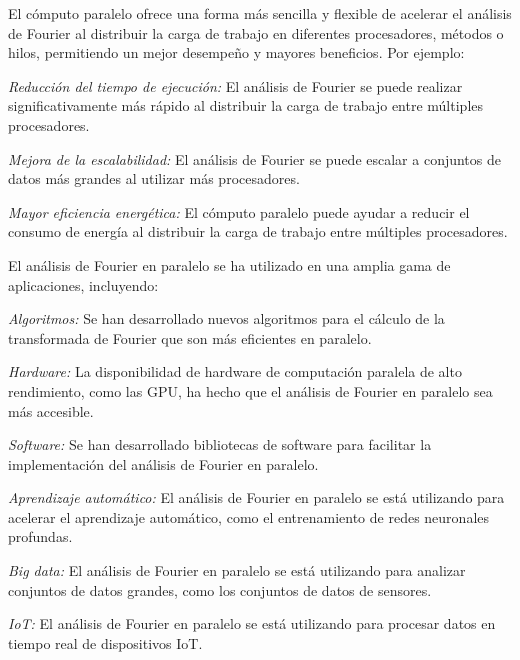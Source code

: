 El cómputo paralelo ofrece una forma más sencilla y flexible de acelerar el análisis de Fourier al distribuir la carga de trabajo en diferentes procesadores, métodos o hilos, permitiendo un mejor desempeño y mayores beneficios. Por ejemplo:

\begin{inparaenum}[1)]
    \item \emph{Reducción del tiempo de ejecución:} El análisis de Fourier se puede realizar significativamente más rápido al distribuir la carga de trabajo entre múltiples procesadores.
    \item \emph{Mejora de la escalabilidad:} El análisis de Fourier se puede escalar a conjuntos de datos más grandes al utilizar más procesadores.
    \item \emph{Mayor eficiencia energética:} El cómputo paralelo puede ayudar a reducir el consumo de energía al distribuir la carga de trabajo entre múltiples procesadores.
\end{inparaenum}

El análisis de Fourier en paralelo se ha utilizado en una amplia gama de aplicaciones, incluyendo:

\begin{inparaenum}[1)]
	\item \emph{Algoritmos:} Se han desarrollado nuevos algoritmos para el cálculo de la transformada de Fourier que son más eficientes en paralelo.
    \item \emph{Hardware:} La disponibilidad de hardware de computación paralela de alto rendimiento, como las GPU, ha hecho que el análisis de Fourier en paralelo sea más accesible.
    \item \emph{Software:} Se han desarrollado bibliotecas de software para facilitar la implementación del análisis de Fourier en paralelo.
\end{inparaenum}

\begin{inparaenum}[1)]
	\item \emph{Aprendizaje automático:} El análisis de Fourier en paralelo se está utilizando para acelerar el aprendizaje automático, como el entrenamiento de redes neuronales profundas.
    \item \emph{Big data:} El análisis de Fourier en paralelo se está utilizando para analizar conjuntos de datos grandes, como los conjuntos de datos de sensores.
    \item \emph{IoT:} El análisis de Fourier en paralelo se está utilizando para procesar datos en tiempo real de dispositivos IoT.
\end{inparaenum}
